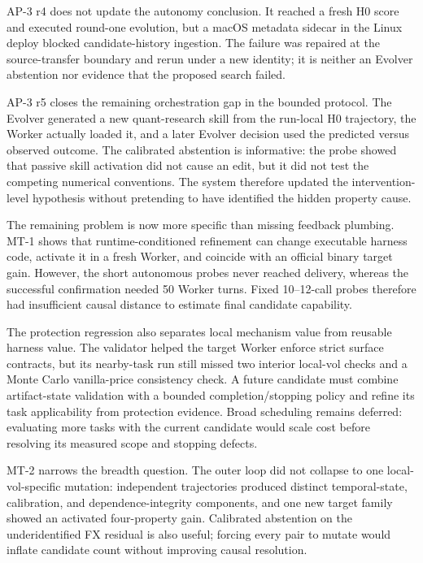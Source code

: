 AP-3 r4 does not update the autonomy conclusion. It reached a fresh H0 score
and executed round-one evolution, but a macOS metadata sidecar in the Linux
deploy blocked candidate-history ingestion. The failure was repaired at the
source-transfer boundary and rerun under a new identity; it is neither an
Evolver abstention nor evidence that the proposed search failed.

AP-3 r5 closes the remaining orchestration gap in the bounded protocol. The
Evolver generated a new quant-research skill from the run-local H0 trajectory,
the Worker actually loaded it, and a later Evolver decision used the predicted
versus observed outcome. The calibrated abstention is informative: the probe
showed that passive skill activation did not cause an edit, but it did not test
the competing numerical conventions. The system therefore updated the
intervention-level hypothesis without pretending to have identified the hidden
property cause.

The remaining problem is now more specific than missing feedback plumbing.
MT-1 shows that runtime-conditioned refinement can change executable harness
code, activate it in a fresh Worker, and coincide with an official binary
target gain. However, the short autonomous probes never reached delivery,
whereas the successful confirmation needed 50 Worker turns. Fixed 10--12-call
probes therefore had insufficient causal distance to estimate final candidate
capability.

The protection regression also separates local mechanism value from reusable
harness value. The validator helped the target Worker enforce strict surface
contracts, but its nearby-task run still missed two interior local-vol checks
and a Monte Carlo vanilla-price consistency check. A future candidate must
combine artifact-state validation with a bounded completion/stopping policy
and refine its task applicability from protection evidence. Broad scheduling
remains deferred: evaluating more tasks with the current candidate would scale
cost before resolving its measured scope and stopping defects.


MT-2 narrows the breadth question. The outer loop did not collapse to one
local-vol-specific mutation: independent trajectories produced distinct
temporal-state, calibration, and dependence-integrity components, and one new
target family showed an activated four-property gain. Calibrated abstention on
the underidentified FX residual is also useful; forcing every pair to mutate
would inflate candidate count without improving causal resolution.

